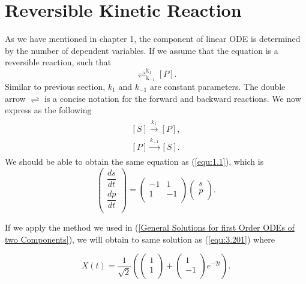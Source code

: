 \documentclass[a4paper]{report}
\theoremstyle{definition}
\begin{document}
\section{Reversible Kinetic Reaction}
\label{Reversible Kinetic Reaction}
As we have mentioned in chapter 1, the component of linear ODE is determined by the number of dependent variables. If we assume that the equation is a reversible reaction, such that
\begin{equation}
[S]\mathrel{\mathop{\rightleftharpoons}^{\mathrm{k_1}}_{\mathrm{k_{-1}}}}[P].
\end{equation}
Similar to previous section, $k_1$ and $k_{-1}$ are constant parameters. The double arrow $\rightleftharpoons$ is a concise notation for the forward and backward reactions. We now express as the following
\begin{align}
\begin{split}
[S]{\overset{k_1}{\rightarrow}}[P],
\\
[P]{\overset{k_{-1}}{\rightarrow}}[S].
\end{split}
\end{align}
\medskip
We should be able to obtain the same equation as (\ref{equ:1.1}), which is
\begin{equation}
\left(
\begin{array}{c}
\dfrac{ds}{dt}\\
\dfrac{dp}{dt}\\
\end{array} 
\right)= 
\left(
\begin{array}{cc}
-1 & 1\\
1 & -1\\
\end{array}
\right)
\left(
\begin{array}{c}
s \\
p \\
\end{array}
\right).
\end{equation}


If we apply the method we used in (\ref{General Solutions for first Order ODEs of two Components}), we will obtain to same solution as (\ref{equ:3.201}) where

\begin{equation}
X(t)= \dfrac{1}{\sqrt{2}}\left( \left(
\begin{array}{c}
1 \\
1 \\
\end{array}
\right)
+
\left(
\begin{array}{c}
1 \\
-1 \\
\end{array}
\right)e^{-2t}\right)
.
\end{equation}
\medskip
\end{document}
